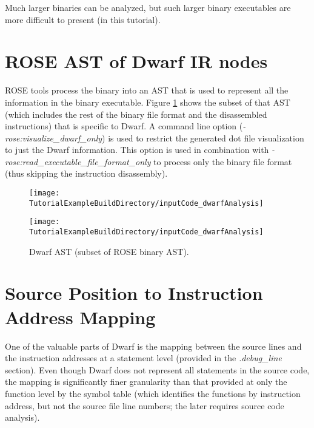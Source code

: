 Much larger binaries can be analyzed, but such larger binary executables are more
difficult to present (in this tutorial).


\section{ROSE AST of Dwarf IR nodes}

   ROSE tools process the binary into an AST that is used to represent all the
information in the binary executable.  Figure \ref{Tutorial:Dwarf_AST_example}
shows the subset of that AST (which includes the rest of the binary file format
and the disassembled instructions) that is specific to Dwarf.  A command line option
({\em -rose:visualize\_dwarf\_only}) is used to restrict the generated dot file 
visualization to just the Dwarf information. This option is used in combination with 
{\em -rose:read\_executable\_file\_format\_only} to process only the binary file format
(thus skipping the instruction disassembly).

\begin{figure}[h]
{\indent
{\mySmallFontSize

\begin{latexonly}
   \texttt{[image: \\TutorialExampleBuildDirectory/inputCode\_dwarfAnalysis]}
\end{latexonly}

\begin{htmlonly}
   \texttt{[image: \\TutorialExampleBuildDirectory/inputCode\_dwarfAnalysis]}
\end{htmlonly}

}
}
\caption{Dwarf AST (subset of ROSE binary AST).}
\label{Tutorial:Dwarf_AST_example}
\end{figure}



\section{Source Position to Instruction Address Mapping}

   One of the valuable parts of Dwarf is the mapping between the 
source lines and the instruction addresses at a statement level
(provided in the {\em .debug\_line} section).
Even though Dwarf does not represent all statements in the source
code, the mapping is significantly finer granularity than that
provided at only the function level by the symbol table (which
identifies the functions by instruction address, but not the 
source file line numbers; the later requires source code analysis).

